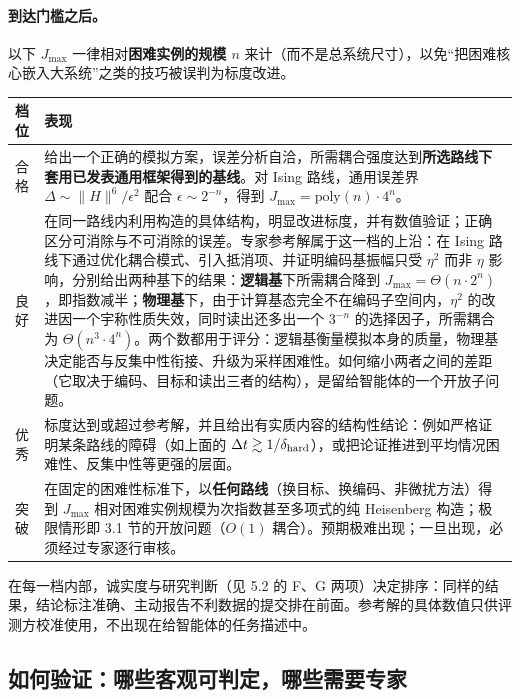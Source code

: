 \documentclass[11pt,a4paper,fontset=none]{ctexart}
\begin{document}
\paragraph{到达门槛之后。}以下 $J_{\max}$ 一律相对\textbf{困难实例的规模 $n$} 来计（而不是总系统尺寸），以免“把困难核心嵌入大系统”之类的技巧被误判为标度改进。

\begin{center}
\renewcommand{\arraystretch}{1.25}
\begin{tabularx}{\textwidth}{@{}l Y@{}}
\toprule
档位 & 表现 \\
\midrule
合格 & 给出一个正确的模拟方案，误差分析自洽，所需耦合强度达到\textbf{所选路线下套用已发表通用框架\cite{CMP2018}得到的基线}。对 Ising 路线，通用误差界 $\Delta\sim\|H\|^{6}/\epsilon^{2}$ 配合 $\epsilon\sim 2^{-n}$，得到 $J_{\max}=\mathrm{poly}(n)\cdot 4^{n}$。 \\
良好 & 在同一路线内利用构造的具体结构，明显改进标度，并有数值验证；正确区分可消除与不可消除的误差。专家参考解属于这一档的上沿：在 Ising 路线下通过优化耦合模式、引入抵消项、并证明编码基振幅只受 $\eta^2$ 而非 $\eta$ 影响，分别给出两种基下的结果：\textbf{逻辑基}下所需耦合降到 $J_{\max}=\Theta(n\cdot 2^{n})$，即指数减半；\textbf{物理基}下，由于计算基态完全不在编码子空间内，$\eta^2$ 的改进因一个宇称性质失效，同时读出还多出一个 $3^{-n}$ 的选择因子，所需耦合为 $\Theta(n^{3}\cdot 4^{n})$。两个数都用于评分：逻辑基衡量模拟本身的质量，物理基决定能否与反集中性衔接、升级为采样困难性。如何缩小两者之间的差距（它取决于编码、目标和读出三者的结构），是留给智能体的一个开放子问题。 \\
优秀 & 标度达到或超过参考解，并且给出有实质内容的结构性结论：例如严格证明某条路线的障碍（如上面的 $\Delta t\gtrsim 1/\delta_{\rm hard}$），或把论证推进到平均情况困难性、反集中性等更强的层面。 \\
突破 & 在固定的困难性标准下，以\textbf{任何路线}（换目标、换编码、非微扰方法）得到 $J_{\max}$ 相对困难实例规模为次指数甚至多项式的纯 Heisenberg 构造；极限情形即 3.1 节的开放问题（$O(1)$ 耦合）。预期极难出现；一旦出现，必须经过专家逐行审核。 \\
\bottomrule
\end{tabularx}
\end{center}

\noindent 在每一档内部，诚实度与研究判断（见 5.2 的 F、G 两项）决定排序：同样的结果，结论标注准确、主动报告不利数据的提交排在前面。参考解的具体数值只供评测方校准使用，不出现在给智能体的任务描述中。

\subsection{如何验证：哪些客观可判定，哪些需要专家}
\end{document}
